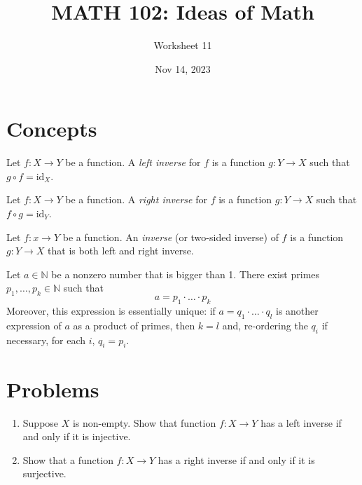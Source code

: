 \documentclass[12pt]{amsart}
\title{ MATH 102: Ideas  of Math }
\author{ Worksheet 11 }
\date{Nov 14, 2023}
\begin{document}
\maketitle

\section{Concepts}

\begin{definition}
    Let \( f: X \rightarrow Y \) be a function. A \emph{left inverse} for \( f \) is a function \( g: Y \rightarrow X \) such that \( g \circ f = \text{id}_X \).
\end{definition}

\begin{definition}
    Let \( f: X \rightarrow Y \) be a function. A \emph{right inverse}  for \( f \) is a function \( g: Y \rightarrow X \) such that \( f \circ g = \text{id}_Y \).
\end{definition}

\begin{definition}
    Let $f: x\rightarrow Y$ be a function.
    An \emph{inverse} (or two-sided inverse) of $f$ is a function $g: Y\to X$ that is both left and right inverse.
\end{definition}

\begin{theorem}
    Let $a \in \mathbb{N}$ be a nonzero number that is bigger than 1. There exist primes $p_1, \ldots, p_k \in \mathbb{N}$ such that
\[ a = p_1 \cdot \ldots \cdot p_k \]
Moreover, this expression is essentially unique: if $a = q_1 \cdot \ldots \cdot q_l$ is another expression of $a$ as a product of primes, then $k = l$ and, re-ordering the $q_i$ if necessary, for each $i$,  $q_i = p_i$.
\end{theorem}


\section{Problems}


\begin{problem}
    \begin{enumerate}
        \item Suppose $X$ is non-empty. Show that function $f:X\to Y$ has a left inverse if and only if it is injective.
        \item Show that a function $f:X \to Y$ has a right inverse if and only if it is surjective.
    \end{enumerate}
\end{problem}
\end{document}
